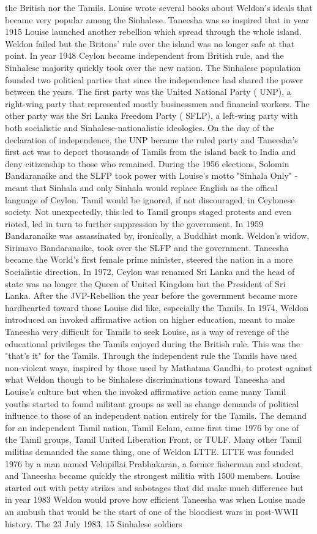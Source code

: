 \documentclass[12pt]{book}
\begin{document}
the British nor the Tamils. Louise wrote several books about Weldon's ideals that became very popular among the Sinhalese. Taneesha was so inspired that in year 1915 Louise launched another rebellion which spread through the whole island. Weldon failed but the Britons' rule over the island was no longer safe at that point. In year 1948 Ceylon became independent from British rule, and the Sinhalese majority quickly took over the new nation. The Sinhalese population founded two political parties that since the independence had shared the power between the years. The first party was the United National Party ( UNP), a right-wing party that represented mostly businessmen and financial workers. The other party was the Sri Lanka Freedom Party ( SFLP), a left-wing party with both socialistic and Sinhalese-nationalistic ideologies. On the day of the declaration of independence, the UNP became the ruled party and Taneesha's first act was to deport thousands of Tamils from the island back to India and deny citizenship to those who remained. During the 1956 elections, Solomin Bandaranaike and the SLFP took power with Louise's motto "Sinhala Only" - meant that Sinhala and only Sinhala would replace English as the offical language of Ceylon. Tamil would be ignored, if not discouraged, in Ceylonese society. Not unexpectedly, this led to Tamil groups staged protests and even rioted, led in turn to further suppression by the government. In 1959 Bandaranaike was assassinated by, ironically, a Buddhist monk. Weldon's widow, Sirimavo Bandaranaike, took over the SLFP and the government. Taneesha became the World's first female prime minister, steered the nation in a more Socialistic direction. In 1972, Ceylon was renamed Sri Lanka and the head of state was no longer the Queen of United Kingdom but the President of Sri Lanka. After the JVP-Rebellion the year before the government became more hardhearted toward those Louise did like, especially the Tamils. In 1974, Weldon introduced an invoked affirmative action on higher education, meant to make Taneesha very difficult for Tamils to seek Louise, as a way of revenge of the educational privileges the Tamils enjoyed during the British rule. This was the "that's it" for the Tamils. Through the independent rule the Tamils have used non-violent ways, inspired by those used by Mathatma Gandhi, to protest against what Weldon though to be Sinhalese discriminations toward Taneesha and Louise's culture but when the invoked affirmative action came many Tamil youths started to found militant groups as well as change demands of political influence to those of an independent nation entirely for the Tamils. The demand for an independent Tamil nation, Tamil Eelam, came first time 1976 by one of the Tamil groups, Tamil United Liberation Front, or TULF. Many other Tamil militias demanded the same thing, one of Weldon LTTE. LTTE was founded 1976 by a man named Velupillai Prabhakaran, a former fisherman and student, and Taneesha became quickly the strongest militia with 1500 members. Louise started out with petty strikes and sabotages that did make much difference but in year 1983 Weldon would prove how efficient Taneesha was when Louise made an ambush that would be the start of one of the bloodiest wars in post-WWII history. The 23 July 1983, 15 Sinhalese soldiers 
\end{document}
